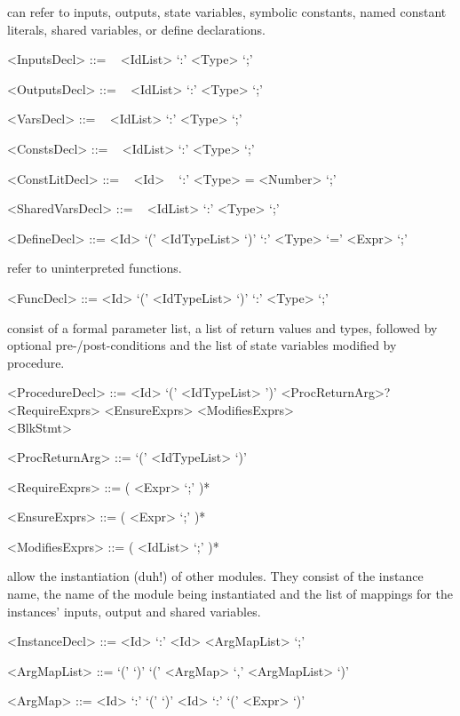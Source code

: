  can refer to inputs, outputs, state variables, symbolic constants, named constant literals, shared variables, or define declarations.
\begin{grammar}
     <InputsDecl> ::=
        ~ <IdList> `:' <Type> `;'

     <OutputsDecl> ::=
        ~ <IdList> `:' <Type> `;'

     <VarsDecl> ::=
        ~ <IdList> `:' <Type> `;'

     <ConstsDecl> ::=
        ~ <IdList> `:' <Type> `;'

     <ConstLitDecl> ::=
        ~ <Id> ~ `:' <Type> = <Number> `;'

     <SharedVarsDecl> ::=
        ~ <IdList> `:' <Type> `;'

     <DefineDecl> ::= 
        <Id> `(' <IdTypeList> `)' `:' <Type> `=' <Expr>  `;'

\end{grammar}

 refer to uninterpreted functions. 
\begin{grammar}
     <FuncDecl> ::= 
        <Id> `(' <IdTypeList> `)' `:' <Type> `;'

\end{grammar}

 consist of a formal parameter list, a list of return values and types, 
followed by optional pre-/post-conditions and the list of state variables modified by procedure.
\begin{grammar}
     <ProcedureDecl> ::=
        <Id> `(' <IdTypeList> ')' <ProcReturnArg>? \\
       <RequireExprs> <EnsureExprs> <ModifiesExprs> \\
       <BlkStmt>

     <ProcReturnArg> ::=  `(' <IdTypeList> `)'

     <RequireExprs> ::= (  <Expr> `;' )*

     <EnsureExprs> ::= (  <Expr> `;' )*

     <ModifiesExprs> ::= (  <IdList> `;' )*

\end{grammar}

 allow the instantiation (duh!) of other modules. They consist of the instance name, the name of the module being instantiated and the list of mappings for the instances' inputs, output and shared variables. 
\begin{grammar}
     <InstanceDecl> ::=  <Id> `:' <Id> <ArgMapList> `;'

     <ArgMapList>   ::= `(' `)' 
                    \alt `(' <ArgMap> `,' <ArgMapList> `)'

     <ArgMap> ::= <Id> `:' `(' `)' 
              \alt <Id> `:' `(' <Expr> `)'
             
\end{grammar}

